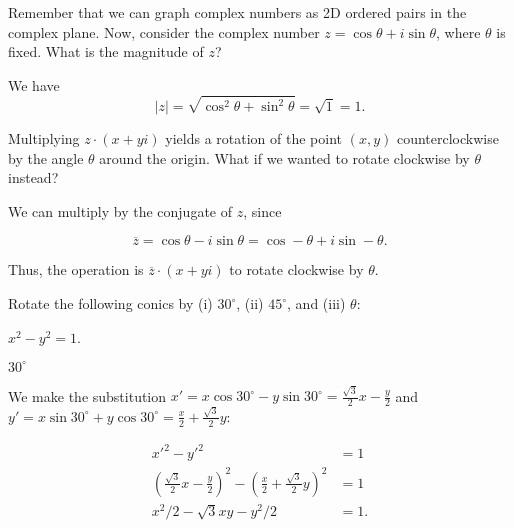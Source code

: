 \documentclass[../gatm_answers.tex]{subfiles}
\begin{document}
\begin{inner_problem}[start=1]
\item Remember that we can graph complex numbers as 2D ordered pairs in the complex plane. Now, consider the complex number $z=\cos \theta + i\sin\theta$, where $\theta$ is fixed. What is the magnitude of $z$?
\end{inner_problem}

\noindent We have $$|z|=\sqrt{\cos^2\theta + \sin^2\theta}=\sqrt{1}=1.$$

\begin{inner_problem}
\item Multiplying $z\cdot(x+yi)$ yields a rotation of the point $(x,y)$ counterclockwise by the angle $\theta$ around the origin. What if we wanted to rotate clockwise by $\theta$ instead?
\end{inner_problem}

\noindent We can multiply by the conjugate of $z$, since

$$\overline{z}=\cos\theta - i\sin\theta = \cos-\theta + i\sin-\theta.$$

\noindent Thus, the operation is $\overline{z}\cdot (x+yi)$ to rotate clockwise by $\theta$.

\begin{outer_problem}
\item Rotate the following conics by (i) $30^\circ$, (ii) $45^\circ$, and (iii) $\theta$:
\end{outer_problem}

\begin{inner_problem}[start=1]
\item $x^2-y^2=1$.
\end{inner_problem}

\begin{iinner_problem}[start=1]
\item $30^\circ$
\end{iinner_problem}

\noindent We make the substitution $x'=x \cos 30^\circ - y\sin 30^\circ=\frac{\sqrt{3}}{2}x-\frac{y}{2}$ and $y'=x\sin 30^\circ + y\cos 30^\circ=\frac{x}{2}+\frac{\sqrt{3}}{2}y$:

\begin{align*}
x'^2-y'^2&=1 \\
\left(\frac{\sqrt{3}}{2}x-\frac{y}{2}\right)^2 - \left(\frac{x}{2}+\frac{\sqrt{3}}{2}y\right)^2 &= 1 \\
x^2/2 - \sqrt{3} x y - y^2/2 &= 1.
\end{align*}
\end{document}
